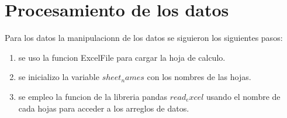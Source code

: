 
\section{Procesamiento de los datos}

\begin{flushleft}
    Para los datos la manipulacionn de los datos se siguieron los siguientes pasos:
\end{flushleft}

\begin{enumerate}
    \item se uso la funcion ExcelFile para cargar la hoja de calculo.
    \item se inicializo la variable $sheet_names$ con los nombres de las hojas.
    \item se empleo la funcion de la libreria pandas $read_excel$ usando el nombre de cada hojas para acceder a los arreglos de datos.
\end{enumerate}
